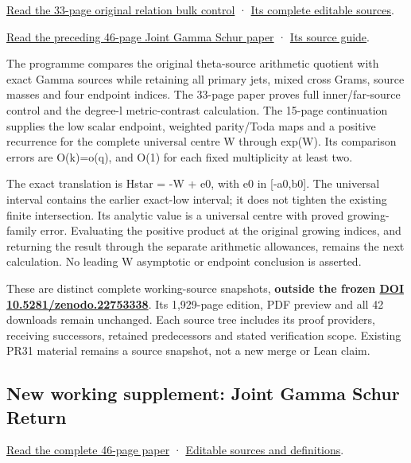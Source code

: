 \documentclass[
]{article}
\begin{document}
\href{workbenches/splitzero-tandem/continuations/20260914-original-relation-bulk/Original_Relation_Bulk_Control.pdf}{Read
the 33-page original relation bulk control} ·
\href{workbenches/splitzero-tandem/continuations/20260914-original-relation-bulk/README.md}{Its
complete editable sources}.

\href{workbenches/splitzero-tandem/continuations/20260914-joint-gamma-schur/Joint_Gamma_Schur_Continuation.pdf}{Read
the preceding 46-page Joint Gamma Schur paper} ·
\href{workbenches/splitzero-tandem/continuations/20260914-joint-gamma-schur/README.md}{Its
source guide}.

The programme compares the original theta-source arithmetic quotient
with exact Gamma sources while retaining all primary jets, mixed cross
Grams, source masses and four endpoint indices. The 33-page paper proves
full inner/far-source control and the degree-l metric-contrast
calculation. The 15-page continuation supplies the low scalar endpoint,
weighted parity/Toda maps and a positive recurrence for the complete
universal centre W through exp(W). Its comparison errors are O(k)=o(q),
and O(1) for each fixed multiplicity at least two.

The exact translation is Hstar = -W + e0, with e0 in {[}-a0,b0{]}. The
universal interval contains the earlier exact-low interval; it does not
tighten the existing finite intersection. Its analytic value is a
universal centre with proved growing-family error. Evaluating the
positive product at the original growing indices, and returning the
result through the separate arithmetic allowances, remains the next
calculation. No leading W asymptotic or endpoint conclusion is asserted.

These are distinct complete working-source snapshots, \textbf{outside
the frozen \href{https://doi.org/10.5281/zenodo.22753338}{DOI
10.5281/zenodo.22753338}}. Its 1,929-page edition, PDF preview and all
42 downloads remain unchanged. Each source tree includes its proof
providers, receiving successors, retained predecessors and stated
verification scope. Existing PR31 material remains a source snapshot,
not a new merge or Lean claim.

\subsection{New working supplement: Joint Gamma Schur
Return}\label{new-working-supplement-joint-gamma-schur-return}

\href{workbenches/splitzero-tandem/continuations/20260914-joint-gamma-schur/Joint_Gamma_Schur_Continuation.pdf}{Read
the complete 46-page paper} ·
\href{workbenches/splitzero-tandem/continuations/20260914-joint-gamma-schur/README.md}{Editable
sources and definitions}.
\end{document}
